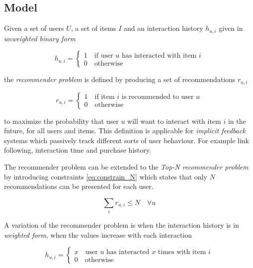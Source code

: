 
\subsection{Model}\label{sec:background:theory:model}

Given a set of users $U$, a set of items $I$ and an interaction history $h_{u, i}$ given in \textit{unweighted binary form}

\begin{equation}\label{eq:hist}
    h_{u, i} = \begin{cases}
        1 \quad \text{if user $u$ has interacted with item $i$} \\
        0 \quad \text{otherwise}
    \end{cases}
\end{equation}

the \textit{recommender problem} is defined by producing a set of recommendations $r_{u, i}$

\begin{equation}
    r_{u, i} = \begin{cases}
        1 \quad \text{if item $i$ is recommended to user $u$} \\
        0 \quad \text{otherwise}
    \end{cases}
\end{equation}

to maximize the probability that user $u$ will want to interact with item $i$ in the future, for all users and items.  This definition is applicable for \textit{implicit feedback} systems which passively track different sorts of user behaviour. For example link following, interaction time and purchase history.

The recommender problem can be extended to the \textit{Top-N recommender problem} by introducing constraints \eqref{eq:constrain_N} which states that only $N$ recommendations can be presented for each user.

\begin{equation}\label{eq:constrain_N}
    \sum_i r_{u, i} \leq N \quad \forall u
\end{equation}


A variation of the recommender problem is when the interaction history is in \textit{weighted form}, when the values increase with each interaction

\begin{equation}\label{eq:whist}
    h_{u, i} = \begin{cases}
        x \quad \text{user $u$ has interacted $x$ times with item $i$} \\
        0 \quad \text{otherwise}
    \end{cases}
\end{equation}

